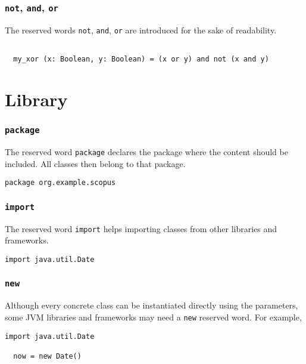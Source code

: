 \documentclass[12pt,a4paper]{book}
\newcommand{\srccode}[1]{\texttt{{#1}}}
\newcommand{\reservedWord}[1]{{\color{blue}\srccode{#1}}\xspace}
\newcommand{\snot}{\reservedWord{not}}
\newcommand{\sand}{\reservedWord{and}}
\newcommand{\sor}{\reservedWord{or}}
\newcommand{\spackage}{\reservedWord{package}}
\newcommand{\simport}{\reservedWord{import}}
\newcommand{\snew}{\reservedWord{new}}
\begin{document}
    \subsubsection{\snot, \sand, \sor}

    The reserved words \snot, \sand, \sor are introduced for the sake of readability.

    \begin{lstlisting}[label={lst:exampleNotAndOr}]

  my_xor (x: Boolean, y: Boolean) = (x or y) and not (x and y)

    \end{lstlisting}


    \section{Library}

    \subsubsection{\spackage}

    The reserved word \spackage declares the package where the content should be included.
    All classes then belong to that package.

    \begin{lstlisting}[label={lst:examplePackage}]
  package org.example.scopus
    \end{lstlisting}

    \subsubsection{\simport}

    The reserved word \simport helps importing classes from other libraries and frameworks.

    \begin{lstlisting}[label={lst:exampleImport}]
  import java.util.Date
    \end{lstlisting}

    \subsubsection{\snew}

    Although every concrete class can be instantiated directly using the parameters, some JVM libraries and frameworks may need a \snew reserved word.
    For example,

    \begin{lstlisting}[label={lst:exampleImportDate}]
  import java.util.Date

  now = new Date()
    \end{lstlisting}
\end{document}
